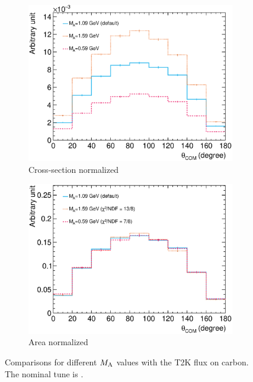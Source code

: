      \begin{figure}
     \centering
     \begin{subfigure}[b]{\dbfigwid\textwidth}
          \centering
          \includegraphics[width=\textwidth]{figures/COM/xnorm-ma-t2k-_da_tan.eps}
          \caption{Cross-section normalized}
          \label{subfig:ma-comp-xsec}
     \end{subfigure}
     \begin{subfigure}[b]{\dbfigwid\textwidth}
          \centering
          \includegraphics[width=\textwidth]{figures/COM/anorm-ma-t2k-_da_tan.eps}
          \caption{Area normalized}
          \label{subfig:ma-comp-area}
     \end{subfigure}
     \caption{Comparisons for different $M_{\textrm{A}}$ values with the T2K flux on carbon. The nominal tune is \gZero.}
     \label{fig:ma-comp}
     \end{figure}

